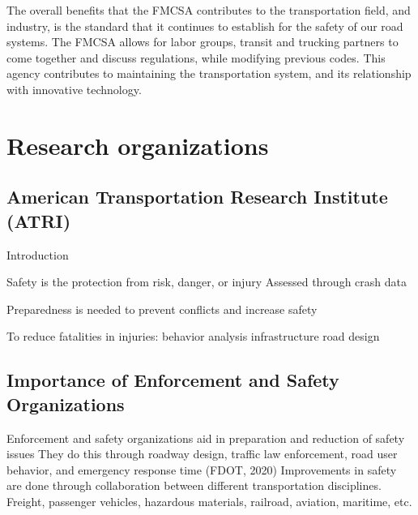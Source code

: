 \documentclass[
]{book}
\begin{document}
The overall benefits that the FMCSA contributes to the transportation field, and industry, is the standard that it continues to establish for the safety of our road systems.
The FMCSA allows for labor groups, transit and trucking partners to come together and discuss regulations, while modifying previous codes.
This agency contributes to maintaining the transportation system, and its relationship with innovative technology.

\hypertarget{organization}{%
\chapter{Research organizations}\label{organization}}

\hypertarget{organization-ATRI}{%
\section{American Transportation Research Institute (ATRI)}\label{organization-ATRI}}

Introduction

Safety is the protection from risk, danger, or injury
Assessed through crash data

Preparedness is needed to prevent conflicts and increase safety

To reduce fatalities in injuries:
behavior analysis
infrastructure
road design

\hypertarget{organization-imp}{%
\section{Importance of Enforcement and Safety Organizations}\label{organization-imp}}

Enforcement and safety organizations aid in preparation and reduction of safety issues
They do this through roadway design, traffic law enforcement, road user behavior, and emergency response time (FDOT, 2020)
Improvements in safety are done through collaboration between different transportation disciplines.
Freight, passenger vehicles, hazardous materials, railroad, aviation, maritime, etc.
\end{document}
